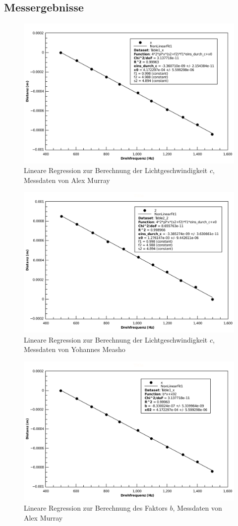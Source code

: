 \subsection{Messergebnisse}

\begin{figure}[H]
    \center
    \includegraphics[width=.8\textwidth]{images/am-f-x-fit-c.pdf}
    \caption{Lineare Regression zur Berechnung der Lichtgeschwindigkeit $c$, Messdaten von Alex Murray}
    \label{fig:am-f-x-fit-c}
\end{figure}

\begin{figure}[H]
    \center
    \includegraphics[width=.8\textwidth]{images/ym-f-x-fit-c.pdf}
    \caption{Lineare Regression zur Berechnung der Lichtgeschwindigkeit $c$, Messdaten von Yohannes Measho}
    \label{fig:ym-f-x-fit-c}
\end{figure}

\begin{figure}[H]
    \center
    \includegraphics[width=.8\textwidth]{images/am-f-x-fit-b.pdf}
    \caption{Lineare Regression zur Berechnung des Faktors $b$, Messdaten von Alex Murray}
    \label{fig:am-f-x-fit-b}
\end{figure}


